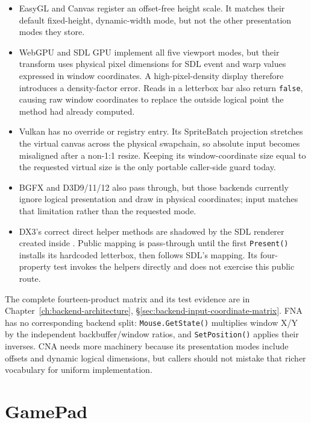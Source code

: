 \begin{itemize}
\item EasyGL and Canvas register an offset-free height scale. It matches their default
  fixed-height, dynamic-width mode, but not the other presentation modes they store.
\item WebGPU and SDL GPU implement all five viewport modes, but their transform uses physical
  pixel dimensions for SDL event and warp values expressed in window coordinates. A
  high-pixel-density display therefore introduces a density-factor error. Reads in a
  letterbox bar also return \texttt{false}, causing raw window coordinates to replace the
  outside logical point the method had already computed.
\item Vulkan has no override or registry entry. Its SpriteBatch projection stretches the
  virtual canvas across the physical swapchain, so absolute input becomes misaligned after a
  non-1:1 resize. Keeping its window-coordinate size equal to the requested virtual size is
  the only portable caller-side guard today.
\item BGFX and D3D9/11/12 also pass through, but those backends currently ignore logical
  presentation and draw in physical coordinates; input matches that limitation rather than
  the requested mode.
\item DX3's correct direct helper methods are shadowed by the SDL renderer created inside
  . Public mapping is pass-through until the first
  \texttt{Present()} installs its hardcoded letterbox, then follows SDL's mapping. Its
  four-property test invokes the helpers directly and does not exercise this public route.
\end{itemize}

The complete fourteen-product matrix and its test evidence are in
Chapter~\ref{ch:backend-architecture},
\S\ref{sec:backend-input-coordinate-matrix}. FNA has no corresponding backend split:
\texttt{Mouse.GetState()} multiplies window X/Y by the independent backbuffer/window ratios,
and \texttt{SetPosition()} applies their inverses. CNA needs more machinery because its
presentation modes include offsets and dynamic logical dimensions, but callers should not
mistake that richer vocabulary for uniform implementation.

\section{GamePad}

